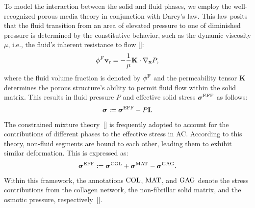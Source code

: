 \documentclass[12pt,a4paper]{report}
\begin{document}
To model the interaction between the solid and fluid phases, we employ the well-recognized porous media theory in conjunction with Darcy's law. This law posits that the fluid transition from an area of elevated pressure to one of diminished pressure is determined by the constitutive behavior, such as the dynamic viscosity $\mu$, i.e., the fluid's inherent resistance to flow [\cite{karl1943,fa1979}]:
%
\begin{equation}\label{eq-darcy}
    \phi^F \mathbf{v}_{\rm r} = -\frac{1}{\mu }\mathbf{K} \cdot \nabla_\mathbf{x} P,
\end{equation}
%
where the fluid volume fraction is denoted by $\phi^{\rm F}$ and the permeability tensor $\mathbf{K}$ determines the porous structure's ability to permit fluid flow within the solid matrix. This results in fluid pressure $P$ and effective solid stress $\boldsymbol{\sigma}^{\rm EFF}$ as follows:
%
\begin{equation}\label{eq-stress}
    \boldsymbol{\sigma} :=  \boldsymbol{\sigma}^{\rm EFF} - P\mathbf{I}.
\end{equation}
%
The constrained mixture theory~[\cite{klisch1999}] is frequently adopted to account for the contributions of different phases to the effective stress in AC. According to this theory, non-fluid segments are bound to each other, leading them to exhibit similar deformation. This is expressed as:
%
\begin{equation}\label{eq-cartilage_solid}
    \boldsymbol{\sigma}^{\rm EFF} :=  \boldsymbol{\sigma}^{\rm COL} + \boldsymbol{\sigma}^{\rm MAT} - \boldsymbol{\sigma}^{\rm GAG}.
\end{equation}
%
Within this framework, the annotations ${\rm COL}$, ${\rm MAT}$, and ${\rm GAG}$ denote the stress contributions from the collagen network, the non-fibrillar solid matrix, and the osmotic pressure, respectively~[\cite{mow1980,wilson2005,sajjadinia2019}].
\end{document}
